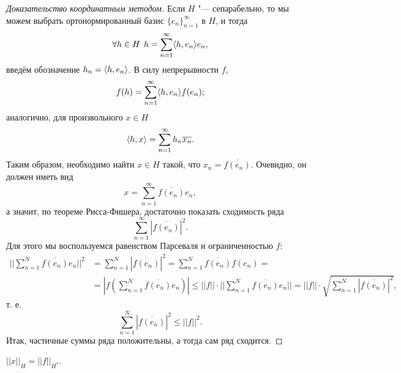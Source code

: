 \documentclass[main]{subfiles}
\begin{document}
\begin{proof}[Доказательство координатным методом]
  Если \( H \) "--- сепарабельно,
  то мы можем выбрать
  ортонормированный базис \( {\{ e_n \}}_{n=1}^\infty \) в \( H \),
  и тогда
  \[
    \forall {h \in H} \; \, h = \sum_{n = 1}^\infty \langle h, e_n \rangle e_n,
  \]
  введём обозначение \( h_n = \langle h, e_n \rangle \).
  В силу непрерывности \( f \),
  \[
    f(h) = \sum_{n=1}^\infty \langle h, e_n \rangle f(e_n);
  \]
  аналогично, для произвольного \( x \in H \)
  \[
    \langle h, x \rangle = \sum_{n=1}^\infty h_n \overline{x_n}.
  \]
  Таким образом, необходимо найти \( x \in H \)
  такой, что \( x_n = \overline{f(e_n)} \).
  Очевидно, он должен иметь вид
  \[
    x = \sum_{n=1}^\infty \overline{f(e_n)} e_n,
  \]
  а значит, по теореме Рисса-Фишера,
  достаточно показать сходимость ряда
  \[
    \sum_{n=1}^\infty \left| \overline{f(e_n)} \right|^2.
  \]
  Для этого мы воспользуемся равенством Парсеваля
  и ограниченностью \( f \):
  \begin{align}
    ||\sum_{n=1}^N \overline{f(e_n)} e_n||^2 &=
    \sum_{n=1}^N \left| \overline{f(e_n)} \right|^2 =
    \sum_{n=1}^N \overline{f(e_n)} f(e_n) = \\
    & = |f(\sum_{n=1}^N \overline{f(e_n)} e_n)| \le
    ||f|| \cdot ||\sum_{n=1}^N \overline{f(e_n)} e_n|| =
    ||f|| \cdot \sqrt{\sum_{n=1}^N \left| \overline{f(e_n)} \right|^2},
  \end{align}
  т. е.
  \[
    \sum_{n=1}^N \left| \overline{f(e_n)} \right|^2 \le ||f||^2.
  \]
  Итак, частичные суммы ряда положительны,
  а тогда сам ряд сходится.
\end{proof}
\begin{corollary}
  \( ||x||_H = ||f||_{H^*} \).
\end{corollary}

\end{document}
